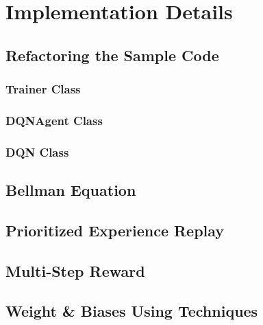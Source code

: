 \section{Implementation Details}
\label{sec:implementation}

\subsection{Refactoring the Sample Code}
\subsubsection{Trainer Class}
\subsubsection{DQNAgent Class}
\subsubsection{DQN Class}
\subsection{Bellman Equation}
\subsection{Prioritized Experience Replay}
\subsection{Multi-Step Reward}
\subsection{Weight \& Biases Using Techniques}
